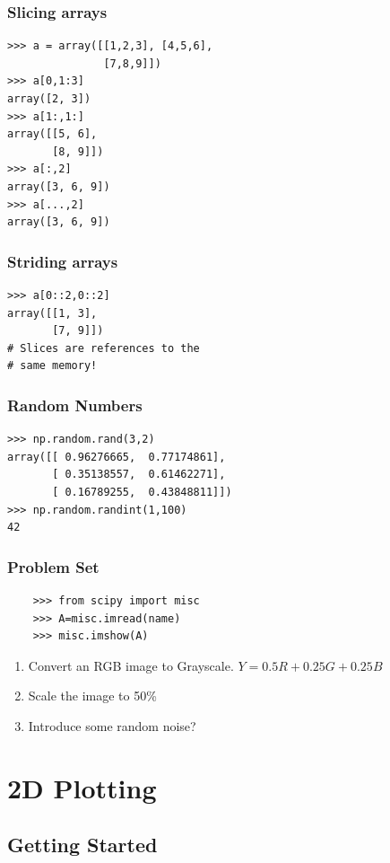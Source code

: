 \documentclass[14pt,compress]{beamer}
\newcounter{time}
\newcommand{\inctime}[1]{\addtocounter{time}{#1}{\tiny \thetime\ m}}
\begin{document}
\begin{frame}[fragile]
  \frametitle{Slicing arrays}
\begin{lstlisting}
>>> a = array([[1,2,3], [4,5,6], 
               [7,8,9]])
>>> a[0,1:3]
array([2, 3])
>>> a[1:,1:]
array([[5, 6],
       [8, 9]])
>>> a[:,2]
array([3, 6, 9])
>>> a[...,2]
array([3, 6, 9])
\end{lstlisting}
\end{frame}

\begin{frame}[fragile]
  \frametitle{Striding arrays}
\begin{lstlisting}
>>> a[0::2,0::2]
array([[1, 3],
       [7, 9]])
# Slices are references to the 
# same memory!
\end{lstlisting}
\end{frame}

\begin{frame}[fragile]
\frametitle{Random Numbers}
\begin{lstlisting}
>>> np.random.rand(3,2)
array([[ 0.96276665,  0.77174861],
       [ 0.35138557,  0.61462271],
       [ 0.16789255,  0.43848811]])
>>> np.random.randint(1,100)
42
\end{lstlisting}
\inctime{15}
\end{frame}

\begin{frame}[fragile]
  \frametitle{Problem Set}
  \begin{lstlisting}
    >>> from scipy import misc
    >>> A=misc.imread(name)
    >>> misc.imshow(A)
  \end{lstlisting}
    \begin{enumerate}
    \item Convert an RGB image to Grayscale. $ Y = 0.5R + 0.25G + 0.25B $
    \item Scale the image to 50\%
    \item Introduce some random noise?
    \end{enumerate}
\inctime{15}
\end{frame}

\section{2D Plotting}
\subsection{Getting Started}
\end{document}
